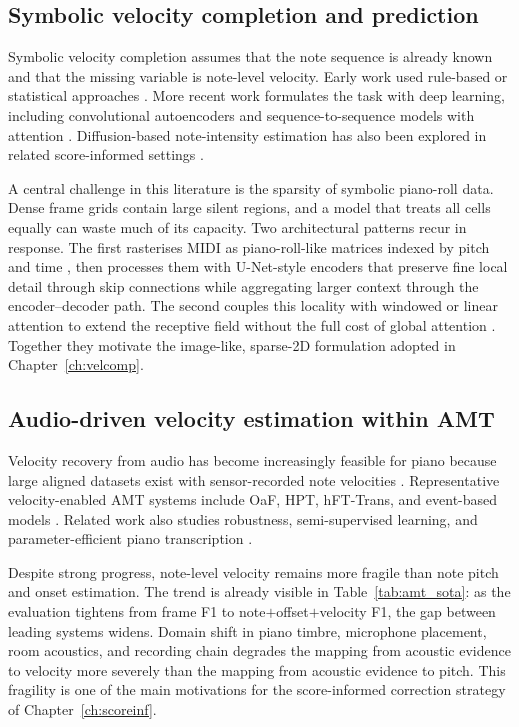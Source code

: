 \subsection{Symbolic velocity completion and prediction}
\label{sec:bg:velocity:symbolic}

Symbolic velocity completion assumes that the note sequence is already known and that the missing variable is note-level velocity. Early work used rule-based or statistical approaches \cite{berndt2010modelling}. More recent work formulates the task with deep learning, including convolutional autoencoders and sequence-to-sequence models with attention \cite{kuo2021velocity,kim2023piano}. Diffusion-based note-intensity estimation has also been explored in related score-informed settings \cite{kim2023diffvel}.

A central challenge in this literature is the sparsity of symbolic piano-roll data. Dense frame grids contain large silent regions, and a model that treats all cells equally can waste much of its capacity. Two architectural patterns recur in response. The first rasterises MIDI as piano-roll-like matrices indexed by pitch and time \cite{he2025filling}, then processes them with U-Net-style encoders that preserve fine local detail through skip connections while aggregating larger context through the encoder--decoder path. The second couples this locality with windowed or linear attention to extend the receptive field without the full cost of global attention \cite{shen2023linear,chen2022hts}. Together they motivate the image-like, sparse-2D formulation adopted in Chapter~\ref{ch:velcomp}.

\subsection{Audio-driven velocity estimation within AMT}
\label{sec:bg:velocity:amt}

Velocity recovery from audio has become increasingly feasible for piano because large aligned datasets exist with sensor-recorded note velocities \cite{hawthorne2019maestro}. Representative velocity-enabled AMT systems include OaF, HPT, hFT-Trans, and event-based models \cite{hawthorne2018onsets,hawthorne2021trans,kong2021hpt,toyama2023hft,yan2021semicrf,yan2024semicrf}. Related work also studies robustness, semi-supervised learning, and parameter-efficient piano transcription \cite{maman2022general,edwards2024general,strahl2024semi,wei2022hppnet,wang2025multitask}.

Despite strong progress, note-level velocity remains more fragile than note pitch and onset estimation. The trend is already visible in Table~\ref{tab:amt_sota}: as the evaluation tightens from frame F1 to note$+$offset$+$velocity F1, the gap between leading systems widens. Domain shift in piano timbre, microphone placement, room acoustics, and recording chain degrades the mapping from acoustic evidence to velocity more severely than the mapping from acoustic evidence to pitch. This fragility is one of the main motivations for the score-informed correction strategy of Chapter~\ref{ch:scoreinf}.

